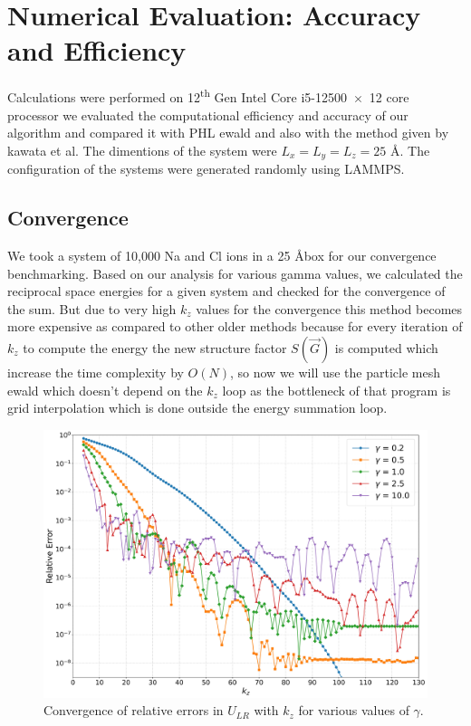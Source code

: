 \chapter{Numerical Evaluation: Accuracy and Efficiency}

\label{Chapter7} %

Calculations were performed on 12\textsuperscript{th} Gen Intel\textsuperscript{\textregistered} Core\texttrademark{} i5-12500~$\times$~12 core processor
we evaluated the computational efficiency and accuracy of our algorithm and compared it with PHL ewald and also with the method given by kawata et al.
The dimentions of the system were $L_x = L_y = L_z = 25$ \AA . The configuration of the systems were generated randomly using LAMMPS.

\section{Convergence}
We took a system of 10,000 Na and Cl ions in a 25 \AA box for our convergence benchmarking.
Based on our analysis for various gamma values, we calculated the reciprocal space energies for a given system and checked for the convergence of the sum. But due to very high $k_z$ values for the convergence this method becomes more expensive as compared to other older methods because for every iteration of $k_z$ to compute the energy the new structure factor $S(\vec G)$ is computed which increase the time complexity by $O(N)$, so now we will use the particle mesh ewald which doesn't depend on the $k_z$ loop as the bottleneck of that program is grid interpolation which is done outside the energy summation loop.
\begin{figure}[H]
    \centering
    \includegraphics[scale=0.4]{images/logerror_vs_kz_forreport.jpg}
    \caption{Convergence of relative errors in $U_{LR}$ with $k_z$ for various values of $\gamma$.}
    \label{fig:result1}
\end{figure}
